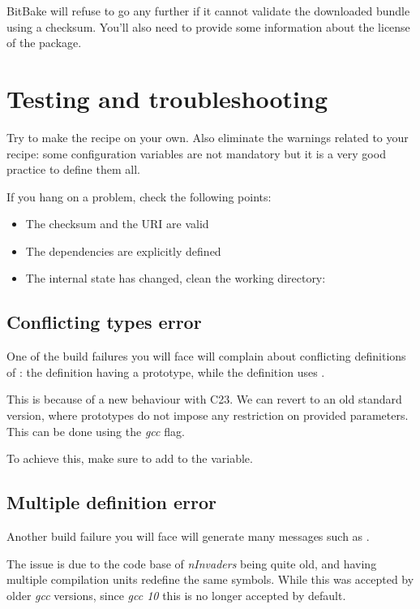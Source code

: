 BitBake will refuse to go any further if it cannot validate the downloaded
bundle using a checksum. You'll also need to provide some information about the
license of the package.

\section{Testing and troubleshooting}

Try to make the recipe on your own. Also eliminate the warnings related to your
recipe: some configuration variables are not mandatory but it is a very good
practice to define them all.

If you hang on a problem, check the following points:
\begin{itemize}
  \item The checksum and the URI are valid
  \item The dependencies are explicitly defined
  \item The internal state has changed, clean the working directory: \\
\end{itemize}

\subsection{Conflicting types error}

One of the build failures you will face will complain about conflicting
definitions of : the definition having a 
prototype, while the definition uses .

This is because of a new behaviour with C23. We can revert to an old standard
version, where  prototypes do not impose any restriction on
provided parameters. This can be done using the  {\em gcc}
flag.

To achieve this, make sure to add  to the 
variable.

\subsection{Multiple definition error}

Another build failure you will face will generate many messages such as
.

The  issue is due to the code base of {\em
nInvaders} being quite old, and having multiple compilation units
redefine the same symbols. While this was accepted by older {\em gcc}
versions, since {\em gcc 10} this is no longer accepted by default.

